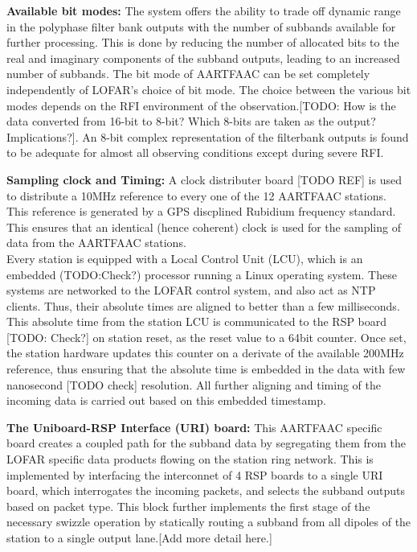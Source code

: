 \documentclass{aa}
\begin{document}
\textbf  {Available bit  modes:}  The system  offers the  ability  to trade  off
dynamic range in  the polyphase filter bank outputs with  the number of subbands
available  for further  processing.  This  is done  by  reducing  the number  of
allocated bits  to the  real and  imaginary components  of the  subband outputs,
leading to an increased number of subbands.  The bit mode of AARTFAAC can be set
completely independently of  LOFAR's choice of bit mode. The  choice between the
various bit modes  depends on the RFI environment of  the observation.[TODO: How
  is the  data converted  from 16-bit to  8-bit? Which 8-bits  are taken  as the
  output?  Implications?].  An  8-bit complex  representation of  the filterbank
outputs  is found  to be  adequate for  almost all  observing conditions  except
during severe RFI.

\textbf {Sampling  clock and Timing:}  A clock  distributer board [TODO  REF] is
used  to  distribute  a  10MHz  reference  to  every  one  of  the  12  AARTFAAC
stations. This  reference is  generated by a  GPS discplined  Rubidium frequency
standard. This ensures that an identical  (hence coherent) clock is used for the
sampling of data from the AARTFAAC stations.\\

Every station is equipped with a Local  Control Unit (LCU), which is an embedded
(TODO:Check?)  processor  running a Linux  operating system.  These  systems are
networked to the LOFAR control system, and  also act as NTP clients. Thus, their
absolute times are aligned to better than a few milliseconds. This absolute time
from the station LCU is communicated to  the RSP board [TODO: Check?] on station
reset, as the  reset value to a  64bit counter.  Once set,  the station hardware
updates  this counter  on a  derivate of  the available  200MHz reference,  thus
ensuring that  the absolute  time is  embedded in the  data with  few nanosecond
[TODO check] resolution. All further aligning and timing of the incoming data is
carried out based on this embedded timestamp.

\textbf {The Uniboard-RSP  Interface (URI) board:} This  AARTFAAC specific board
creates a coupled path  for the subband data by segregating  them from the LOFAR
specific data products flowing on the  station ring network. This is implemented
by interfacing  the interconnet  of 4 RSP  boards to a  single URI  board, which
interrogates  the incoming  packets, and  selects the  subband outputs  based on
packet type.  This block  further implements  the first  stage of  the necessary
swizzle  operation by  statically  routing a  subband from  all  dipoles of  the
station to a single output lane.[Add more detail here.]\\
\end{document}
